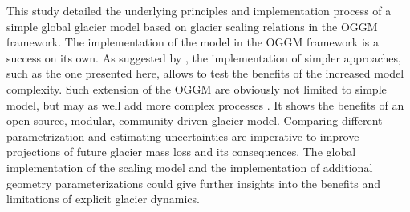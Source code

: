 This study detailed the underlying principles and implementation process of a simple global glacier model based on glacier scaling relations \citep{Marzeion2012b} in the OGGM framework. The implementation of the \vas{} model in the OGGM framework is a success on its own. As suggested by \citet{Maussion2019}, the implementation of simpler approaches, such as the one presented here, allows to test the benefits of the increased model complexity. Such extension of the OGGM are obviously not limited to simple model, but may as well add more complex processes \citep[e.g., an improved calving parametrization,][]{Recinos2019}. It shows the benefits of an open source, modular, community driven glacier model. Comparing different parametrization and estimating uncertainties are imperative to improve projections of future glacier mass loss and its consequences. The global implementation of the scaling model and the implementation of additional geometry parameterizations \citep[e.g., GloGEM by][]{Huss2015} could give further insights into the benefits and limitations of explicit glacier dynamics.
